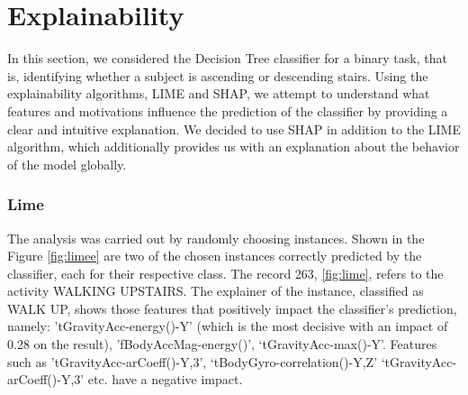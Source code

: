\documentclass[10pt, a4paper, twocolumn]{article}
\begin{document}
\section{Explainability}
In this section, we considered the Decision Tree classifier for a binary task, that is, identifying whether a subject is ascending or descending stairs.  Using the explainability algorithms, LIME and SHAP, we attempt to understand what features and motivations influence the prediction of the classifier by providing a clear and intuitive explanation. We decided to use SHAP in addition to the LIME algorithm, which additionally provides us with an explanation about the behavior of the model globally. 

\subsubsection*{Lime}
The analysis was carried out by randomly choosing instances. Shown in the Figure \ref{fig:limee} are two of the chosen instances correctly predicted by the classifier, each for their respective class.
The record 263, \ref{fig:lime}, refers to the activity WALKING UPSTAIRS. The explainer of the instance, classified as WALK UP, shows those features that positively impact the classifier's prediction, namely: 'tGravityAcc-energy()-Y' (which is the most decisive with an impact of 0.28 on the result), 'fBodyAccMag-energy()', ‘tGravityAcc-max()-Y’.  Features such as 'tGravityAcc-arCoeff()-Y,3’, ‘tBodyGyro-correlation()-Y,Z’ ‘tGravityAcc-arCoeff()-Y,3’ etc. have a negative impact.
\end{document}
